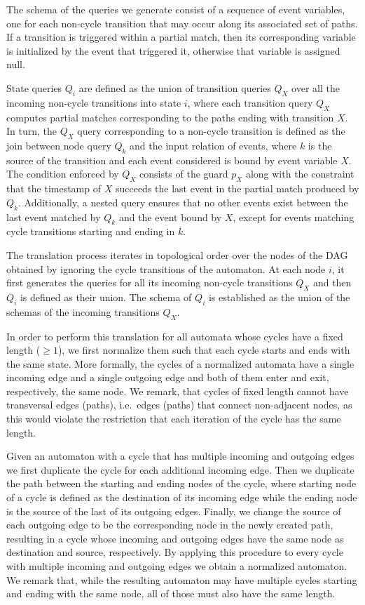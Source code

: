 The schema of the queries we generate consist of a sequence of event variables, 
one for each non-cycle transition that may occur along its associated set of 
paths. 
If a transition is triggered within a partial match, then its corresponding 
variable is initialized by the event that triggered it, otherwise that variable 
is assigned null.


State queries $Q_i$ are defined as the union of transition queries $Q_X$ over 
all the incoming non-cycle transitions into state $i$, where each transition 
query $Q_X$ computes partial matches corresponding to the paths ending with 
transition $X$.
In turn, the $Q_X$ query corresponding to a non-cycle transition is defined as 
the join between node query $Q_k$ and the input relation of events, where $k$ 
is the source of the transition and each event considered is bound by event 
variable $X$.
The condition enforced by $Q_X$ consists of the guard $p_X$ along with the 
constraint that the timestamp of $X$ succeeds the last event in the partial 
match produced by $Q_k$.
Additionally, a nested query ensures that no other events 
exist between the last event matched by $Q_k$ and the event bound by $X$, 
except for events matching cycle transitions starting and ending in $k$.


The translation process iterates in topological order over the nodes of the DAG
obtained by ignoring the cycle transitions of the automaton.
At each node $i$, it first generates the queries for all its incoming
non-cycle transitions $Q_X$ and then $Q_i$ is defined as their union. 
The schema of $Q_i$ is established as the union of the schemas of the incoming 
transitions $Q_X$.


In order to perform this translation for all automata whose cycles have a fixed 
length ($\geq 1$), we first normalize them such that each cycle starts and ends 
with the same state.
More formally, the cycles of a normalized automata have a single incoming edge 
and a single outgoing edge and both of them enter and exit, respectively, the 
same node.
We remark, that cycles of fixed length cannot have transversal edges (paths), 
i.e.\ edges (paths) that connect non-adjacent nodes, as this would violate the 
restriction that each iteration of the cycle has the same length.

Given an automaton with a cycle that has multiple incoming and outgoing edges 
we first duplicate the cycle for each additional incoming edge. 
Then we duplicate the path between the starting and ending nodes of the cycle, 
where starting node of a cycle is defined as the destination of its incoming 
edge while the ending node is the source of the last of its outgoing edges. 
Finally, we change the source of each outgoing edge to be the corresponding 
node in the newly created path, resulting in a cycle whose incoming and 
outgoing edges have the same node as destination and source, respectively.
By applying this procedure to every cycle with multiple incoming and outgoing 
edges we obtain a normalized automaton.  
We remark that, while the resulting automaton may have multiple cycles starting 
and ending with the same node, all of those must also have the same length.


